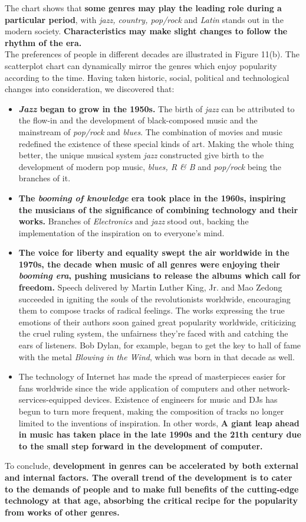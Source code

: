 \documentclass[12pt]{article}
\begin{document}
{The chart shows that \textbf{some genres may play the leading role during a particular period}, with \textit{jazz, country, pop/rock} and \textit{Latin} stands out in the modern society. \textbf{Characteristics may make slight changes to follow the rhythm of the era.}\\[2ex]
The preferences of people in different decades are illustrated in Figure 11(b). The scatterplot chart can dynamically mirror the genres which enjoy popularity according to the time. Having taken historic, social, political and technological changes into consideration, we discovered that:
\begin{itemize}
	\item {\bfseries{\textit{Jazz} began to grow in the 1950s.}} The birth of \textit{jazz} can be attributed to the flow-in and the development of black-composed music and the mainstream of \textit{pop/rock} and \textit{blues}. The combination of movies and music redefined the existence of these special kinds of art. Making the whole thing better, the unique musical system \textit{jazz} constructed give birth to the development of modern pop music, \textit{blues, R \& B} and \textit{pop/rock} being the branches of it.
	\item {\bfseries{The \textit{booming of knowledge} era took place in the 1960s, inspiring the musicians of the significance of combining technology and their works.}} Branches of \textit{Electronics} and \textit{jazz} stood out, backing the implementation of the inspiration on to everyone's mind.
	\item {\bfseries{The voice for liberty and equality swept the air worldwide in the 1970s, the decade when music of all genres were enjoying their \textit{booming era}, pushing musicians to release the albums which call for freedom.}} Speech delivered by Martin Luther King, Jr. and Mao Zedong succeeded in igniting the souls of the revolutionists worldwide, encouraging them to compose tracks of radical feelings. The works expressing the true emotions of their authors soon gained great popularity worldwide, criticizing the cruel ruling system, the unfairness they're faced with and catching the ears of listeners. Bob Dylan, for example, began to get the key to hall of fame with the metal \textit{Blowing in the Wind}, which was born in that decade as well.
	\item The technology of Internet has made the spread of masterpieces easier for fans worldwide since the wide application of computers and other network-services-equipped devices. Existence of engineers for music and DJs has begun to turn more frequent, making the composition of tracks no longer limited to the inventions of inspiration. In other words, \textbf{A giant leap ahead in music has taken place in the late 1990s and the 21th century due to the small step forward in the development of computer.}
\end{itemize}
To conclude, {\textbf{development in genres can be accelerated by both external and internal factors. The overall trend of the development is to cater to the demands of people and to make full benefits of the cutting-edge technology at that age, absorbing the critical recipe for the popularity from works of other genres.}}
\clearpage
}
\end{document}

